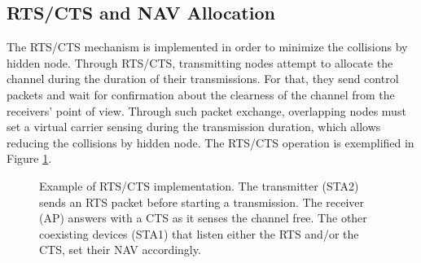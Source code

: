 \documentclass[a4paper]{article}
\begin{document}
	\subsection{RTS/CTS and NAV Allocation}
	The RTS/CTS mechanism is implemented in order to minimize the collisions by hidden node. Through RTS/CTS, transmitting nodes attempt to allocate the channel during the duration of their transmissions. For that, they send control packets and wait for confirmation about the clearness of the channel from the receivers' point of view. Through such packet exchange, overlapping nodes must set a virtual carrier sensing during the transmission duration, which allows reducing the collisions by hidden node. The RTS/CTS operation is exemplified in Figure \ref{fig:rts_cts_mechanism}.
	\begin{figure}[h!]
		\centering
		\caption{Example of RTS/CTS implementation. The transmitter (STA2) sends an RTS packet before starting a transmission. The receiver (AP) answers with a CTS as it senses the channel free. The other coexisting devices (STA1) that listen either the RTS and/or the CTS, set their NAV accordingly.}
		\label{fig:rts_cts_mechanism}
	\end{figure}	
		
\end{document}
